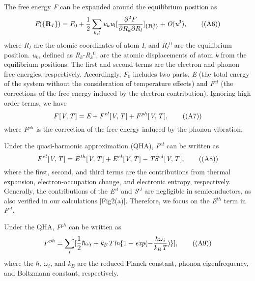 \documentclass[onecolumn,preprint,superscriptaddress]{revtex4-1}
\begin{document}
The free energy \emph{F} can be expanded around the equilibrium position as
\begin{equation}
\emph{F}(\lbrace\textbf{R}_I\rbrace)=\emph{F}_{0}+\frac{1}{2}\sum_{k,l}\emph{u}_{k}\emph{u}_{l}[\frac{\partial^2F}{\partial R_k \partial R_l}]_{\lbrace \textbf{R}_I^{0} \rbrace}+\emph{O}(\emph{u}^{3}),  \tag{(A6)}
\end{equation}
\noindent where \emph{R}$_I$ are the atomic coordinates of atom \emph{I}, and \emph{R}$_I$$^0$ are the equilibrium position. \emph{u}$_{k}$, defined as \emph{R}$_k$-\emph{R}$_k$$^0$, are the atomic displacements of atom \emph{k} from the equilibrium positions. The first and second terms are the electron and phonon free energies, respectively.
Accordingly, \emph{F}$_{0}$ includes two parts, \emph{E} (the total energy of the system without the consideration of temperature effects) and \emph{F}$^{el}$ (the corrections of the free energy induced by the electron contribution). Ignoring high order terms, we have
\begin{equation}
\emph{F}\,[\emph{V},\emph{T}\,]=\emph{E}+\emph{F}^{\,el}[\emph{V},\emph{T}\,]+\emph{F}^{\,ph}[\emph{V},\emph{T}\,],  \tag{(A7)}
\end{equation}
\noindent where \emph{F}$^{ph}$ is the correction of the free energy induced by the phonon vibration.

Under the quasi-harmonic approximation (QHA), \emph{F}$^{el}$ can be written as \cite{13,29,30}
\begin{equation}
\emph{F}^{\,el}[\emph{V},\emph{T}\,]=\emph{E}^{\,th}[\emph{V},\emph{T}\,]+\emph{E}^{\,el}[\emph{V},\emph{T}\,]
-\emph{T}\emph{S}^{\,el}[\emph{V},\emph{T}\,],  \tag{(A8)}
\end{equation}
\noindent where the first, second, and third terms are the contributions from thermal expansion, electron-occupation change, and electronic entropy, respectively. Generally, the contributions of the \emph{E}$^{el}$ and \emph{S}$^{el}$ are negligible in semiconductors, as also verified in our calculations [Fig2(a)]. Therefore, we focus on the \emph{E}$^{th}$ term in \emph{F}$^{el}$.

Under the QHA, \emph{F}$^{ph}$ can be written as \cite{32}
\begin{equation}
\emph{F}^{\,ph}= \sum_{i}[\frac{1}{2}\hbar\omega_{i}+\emph{k}_{B}\emph{T}\,\emph{ln}\lbrace 1-\emph{exp}(-\frac{\hbar \omega _i}{\emph{k}_B\emph{T}})\rbrace],  \tag{(A9)}
\end{equation}
\noindent where the $\hbar$, $\omega$$_{i}$, and \emph{k}$_{B}$ are the reduced Planck constant, phonon eigenfrequency, and Boltzmann constant, respectively.
\end{document}
